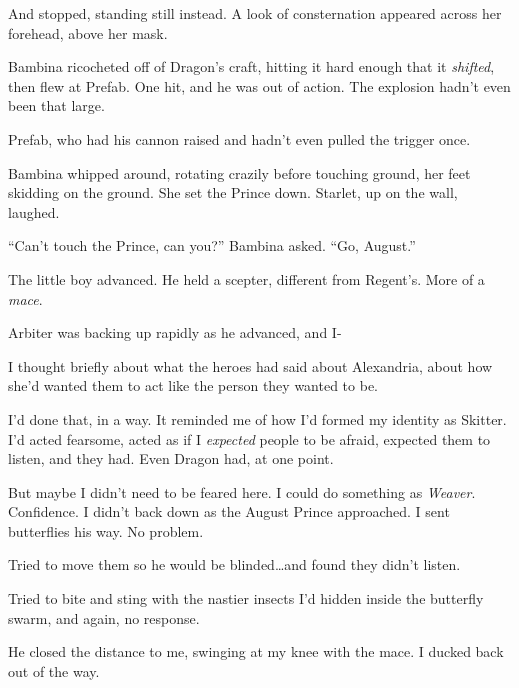 And stopped, standing still instead.  A look of consternation appeared across her forehead, above her mask.



Bambina ricocheted off of Dragon's craft, hitting it hard enough that it \emph{shifted}, then flew at Prefab.  One hit, and he was out of action.  The explosion hadn't even been that large.



Prefab, who had his cannon raised and hadn't even pulled the trigger once.



Bambina whipped around, rotating crazily before touching ground, her feet skidding on the ground.  She set the Prince down.  Starlet, up on the wall, laughed.



``Can't touch the Prince, can you?'' Bambina asked.  ``Go, August.''



The little boy advanced.  He held a scepter, different from Regent's.  More of a \emph{mace}.



Arbiter was backing up rapidly as he advanced, and I-



I thought briefly about what the heroes had said about Alexandria, about how she'd wanted them to act like the person they wanted to be.



I'd done that, in a way.  It reminded me of how I'd formed my identity as Skitter.  I'd acted fearsome, acted as if I \emph{expected }people to be afraid, expected them to listen, and they had.  Even Dragon had, at one point.



But maybe I didn't need to be feared here.  I could do something as \emph{Weaver}.  Confidence.  I didn't back down as the August Prince approached.  I sent butterflies his way.  No problem.



Tried to move them so he would be blinded\ldots and found they didn't listen.



Tried to bite and sting with the nastier insects I'd hidden inside the butterfly swarm, and again, no response.



He closed the distance to me, swinging at my knee with the mace.  I ducked back out of the way.



